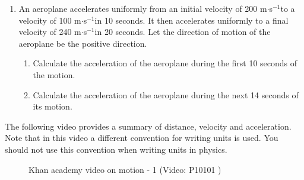 \begin{enumerate}[noitemsep, label=\textbf{\arabic*}. ]
\label{m38794*uid80}\item An aeroplane accelerates uniformly from an initial velocity of 200 m\begin{math}\ensuremath{\cdot}\end{math}s\begin{math}{}^{-1}\end{math}to a velocity of 100 m\begin{math}\ensuremath{\cdot}\end{math}s\begin{math}{}^{-1}\end{math}in 10 seconds. It then accelerates uniformly to a final velocity of 240 m\begin{math}\ensuremath{\cdot}\end{math}s\begin{math}{}^{-1}\end{math}in 20 seconds. Let the direction of motion of the aeroplane be the positive direction.
\label{m38794*id68889}\begin{enumerate}[noitemsep, label=\textbf{\alph*}. ] 
            \label{m38794*uid81}\item Calculate the acceleration of the aeroplane during the first 10 seconds of the motion.
\label{m38794*uid82}\item Calculate the acceleration of the aeroplane during the next 14 seconds of its motion.
\end{enumerate}
                \end{enumerate}
        
      
\label{m38794*eip-307}The following video provides a summary of distance, velocity and acceleration. Note that in this video a different convention for writing units is used. You should not use this convention when writing units in physics.

    \setcounter{subfigure}{0}


	\begin{figure}[H] %
    
    
    \textnormal{Khan academy video on motion - 1}\vspace{.1in} \nopagebreak
  \label{m38794*yt-media1}\label{m38794*yt-video1}
             { (Video:  P10101 )}
      
      \vspace{2pt}
    \vspace{.1in}
    
    

 \end{figure}   

